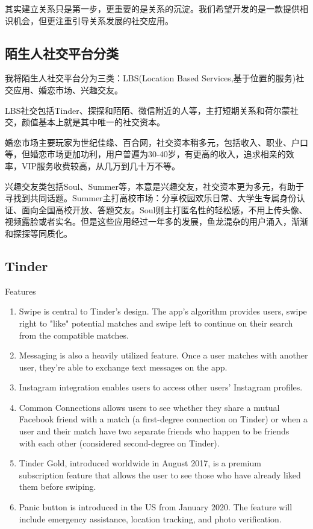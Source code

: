 \documentclass[UTF8]{ctexart}
\begin{document}
其实建立关系只是第一步，更重要的是关系的沉淀。我们希望开发的是一款提供相识机会，但更注重引导关系发展的社交应用。

\subsection{陌生人社交平台分类}
我将陌生人社交平台分为三类：LBS(Location Based Services,基于位置的服务)社交应用、婚恋市场、兴趣交友。

LBS社交包括Tinder、探探和陌陌、微信附近的人等，主打短期关系和荷尔蒙社交，颜值基本上就是其中唯一的社交资本。

婚恋市场主要玩家为世纪佳缘、百合网，社交资本稍多元，包括收入、职业、户口等，但婚恋市场更加功利，用户普遍为30-40岁，有更高的收入，追求相亲的效率，VIP服务收费较高，从几万到几十万不等。

兴趣交友类包括Soul、Summer等，本意是兴趣交友，社交资本更为多元，有助于寻找到共同话题。Summer主打高校市场：分享校园欢乐日常、大学生专属身份认证、面向全国高校开放、答题交友。Soul则主打匿名性的轻松感，不用上传头像、视频露脸或者实名。但是这些应用经过一年多的发展，鱼龙混杂的用户涌入，渐渐和探探等同质化。


\subsection{Tinder}

\begin{tcolorbox}
    Features
    \begin{enumerate}
        \item Swipe is central to Tinder's design. The app's algorithm provides users, swipe right to "like" potential matches and swipe left to continue on their search from the compatible matches.
        \item Messaging is also a heavily utilized feature. Once a user matches with another user, they're able to exchange text messages on the app.
        \item Instagram integration enables users to access other users' Instagram profiles.
        \item Common Connections allows users to see whether they share a mutual Facebook friend with a match (a first-degree connection on Tinder) or when a user and their match have two separate friends who happen to be friends with each other (considered second-degree on Tinder).
        \item Tinder Gold, introduced worldwide in August 2017, is a premium subscription feature that allows the user to see those who have already liked them before swiping.
        \item Panic button is introduced in the US from January 2020. The feature will include emergency assistance, location tracking, and photo verification.\cite{WikiTinderFeatures}
    \end{enumerate}
\end{tcolorbox}
\end{document}
